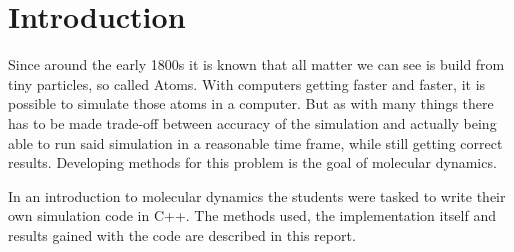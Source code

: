 \chapter{Introduction}
\begin{comment}
- atoms maybe as the first bullet point 1800 know but also the greeks knew, but was kinda forgotten again. Do i need a cite there?! nah
- with stronger computers it became possible to simulate  the atoms, but kinda computationally expensive, methods have to be developed to simplifyc  stuff
- mention like the goal of this, build an own smol simulation
- introduction to md simulation 
- weird mix between chemistry, physics and computation + a lot of programming
- written in c++ instead of the standard python stuff 
- from a developers perspective programming in python will most likely take less time, while programming in be a bit faster (and more complicated)
\end{comment}


Since around the early 1800s it is known that all matter we can see is build from tiny particles, so called Atoms. With computers getting faster and faster, it is possible to simulate those atoms in a computer. But as with many things there has to be made trade-off between accuracy of the simulation and actually being able to run said simulation in a reasonable time frame, while still getting correct results. 
Developing methods for this problem is the goal of molecular dynamics. 
\par 
In an introduction to molecular dynamics the students were tasked to write their own simulation code in C++. The methods used, the implementation itself and results gained with the code are described in this report. 